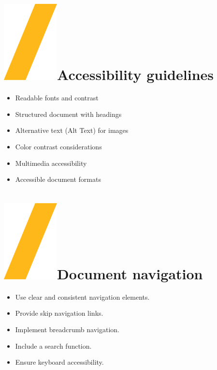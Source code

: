 \documentclass[a0paper,fleqn]{src/betterposter}
\begin{document}
{\section{\includegraphics[height=\fontcharht\font`\S]{img/general/slash.png}Accessibility guidelines}

\begin{itemize}
\item Readable fonts and contrast
\item Structured document with headings
\item Alternative text (Alt Text) for images
\item Color contrast considerations
\item Multimedia accessibility
\item Accessible document formats
\end{itemize}

\section{\includegraphics[height=\fontcharht\font`\S]{img/general/slash.png}Document navigation}

\begin{itemize}
\item Use clear and consistent navigation elements.
\item Provide skip navigation links.
\item Implement breadcrumb navigation.
\item Include a search function.
\item Ensure keyboard accessibility.
\end{itemize}


}
\end{document}
